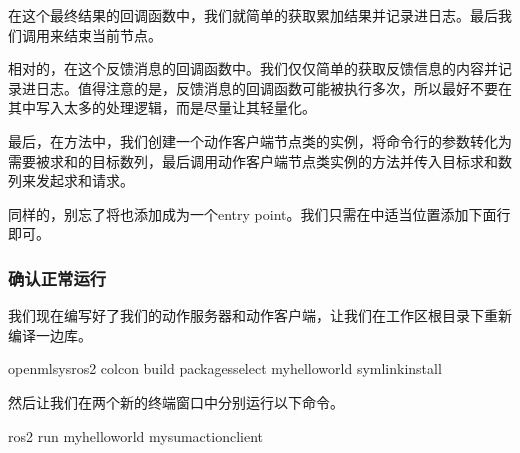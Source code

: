 \documentclass[letterpaper,10pt,english]{sphinxmanual}
\begin{document}
\sphinxAtStartPar
在这个最终结果的回调函数中，我们就简单的获取累加结果并记录进日志。最后我们调用来结束当前节点。

\sphinxAtStartPar
相对的，在这个反馈消息的回调函数中。我们仅仅简单的获取反馈信息的内容并记录进日志。值得注意的是，反馈消息的回调函数可能被执行多次，所以最好不要在其中写入太多的处理逻辑，而是尽量让其轻量化。

\sphinxAtStartPar
最后，在方法中，我们创建一个动作客户端节点类的实例，将命令行的参数转化为需要被求和的目标数列，最后调用动作客户端节点类实例的方法并传入目标求和数列来发起求和请求。

\sphinxAtStartPar
同样的，别忘了将也添加成为一个entry
point。我们只需在中适当位置添加下面行即可。

\begin{sphinxVerbatim}[commandchars=\\\{\}]
\end{sphinxVerbatim}


\subsubsection{确认正常运行}
\label{\detokenize{chapter_rl_sys/ros_code_ex:id19}}
\sphinxAtStartPar
我们现在编写好了我们的动作服务器和动作客户端，让我们在工作区根目录下重新编译一边库。

\begin{sphinxVerbatim}[commandchars=\\\{\}]
 openmlsys\PYGZhy{}ros2
colcon build \PYGZhy{}\PYGZhy{}packages\PYGZhy{}select my\PYGZus{}hello\PYGZus{}world \PYGZhy{}\PYGZhy{}symlink\PYGZhy{}install
\end{sphinxVerbatim}

\sphinxAtStartPar
然后让我们在两个新的终端窗口中分别运行以下命令。

\begin{sphinxVerbatim}[commandchars=\\\{\}]
ros2 run my\PYGZus{}hello\PYGZus{}world my\PYGZus{}sum\PYGZus{}action\PYGZus{}client   
\end{sphinxVerbatim}
\end{document}
